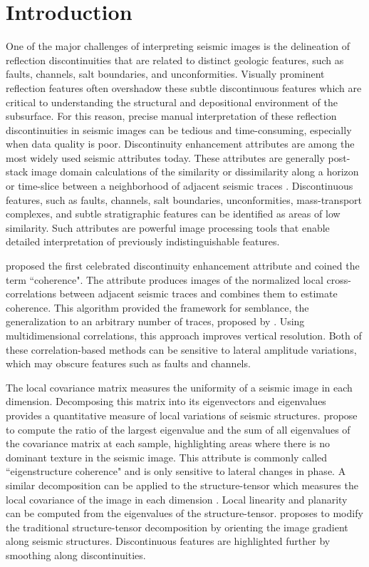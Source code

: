 \section{Introduction}
One of the major challenges of interpreting seismic images is the delineation of reflection discontinuities that are related to distinct geologic features, such as faults, channels, salt boundaries, and unconformities. 
Visually prominent reflection features often overshadow these subtle discontinuous features which are critical to understanding the structural and depositional environment of the subsurface. 
For this reason, precise manual interpretation of these reflection discontinuities in seismic images can be tedious and time-consuming, especially when data quality is poor. 
Discontinuity enhancement attributes are among the most widely used seismic attributes today. 
These attributes are generally post-stack image domain calculations of the similarity or dissimilarity along a horizon or time-slice between a neighborhood of adjacent seismic traces \cite[]{barnes}. 
Discontinuous features, such as faults, channels, salt boundaries, unconformities, mass-transport complexes, and subtle stratigraphic features can be identified as areas of low similarity. 
Such attributes are powerful image processing tools that enable detailed interpretation of previously indistinguishable features.

\cite{bahorich} proposed the first celebrated discontinuity enhancement attribute and coined the term ``coherence". 
The attribute produces images of the normalized local cross-correlations between adjacent seismic traces and combines them to estimate coherence. 
This algorithm provided the framework for semblance, the generalization to an arbitrary number of traces, proposed by \cite{marfurt98}. 
Using multidimensional correlations, this approach improves vertical resolution.
Both of these correlation-based methods can be sensitive to lateral amplitude variations, which may obscure features such as faults and channels.

The local covariance matrix measures the uniformity of a seismic image in each dimension. 
Decomposing this matrix into its eigenvectors and eigenvalues provides a quantitative measure of local variations of seismic structures. 
\cite{gersztenkorn} propose to compute the ratio of the largest eigenvalue and the sum of all eigenvalues of the covariance matrix at each sample, highlighting areas where there is no dominant texture in the seismic image.
This attribute is commonly called ``eigenstructure coherence" and is only sensitive to lateral changes in phase.
A similar decomposition can be applied to the structure-tensor which measures the local covariance of the image in each dimension \cite[]{randen00,randen01,bakker}.
Local linearity and planarity can be computed from the eigenvalues of the structure-tensor.
\cite{wu17} proposes to modify the traditional structure-tensor decomposition by orienting the image gradient along seismic structures.
Discontinuous features are highlighted further by smoothing along discontinuities.

